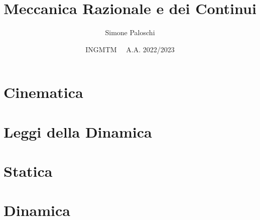 \documentclass{article}
\title{Meccanica Razionale e dei Continui}
\author{Simone Paloschi}
\date{INGMTM \ \ A.A. 2022/2023}
\theoremstyle{unnumbered}
\theoremstyle{unnumbered1}
\begin{document}
\maketitle


\begingroup
  \hypersetup{hidelinks}
  \tableofcontents
\endgroup


\pagebreak

%
%
\section{Cinematica}
\section{Leggi della Dinamica}
\section{Statica}

\newpage

\section{Dinamica}
\end{document}
